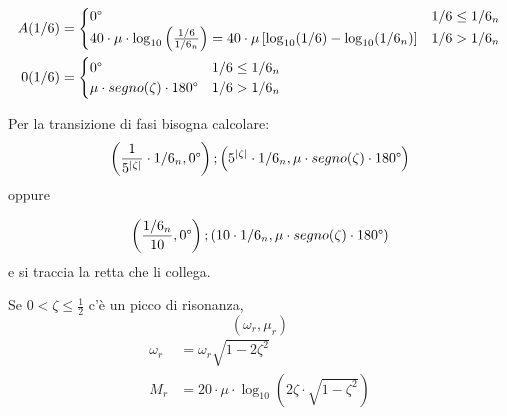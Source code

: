 \documentclass[a4paper]{article}
\begin{document}
\begin{definition}
  \[
    \begin{aligned}
      A(1/6) &= \begin{cases}
        0\degree & 1/6 \le 1/6_n\\
        40 \cdot \mu \cdot \log_{10} \left( \frac{1/6}{1/6_n} \right) = 40 \cdot \mu \left[
      \log_{10}(1/6) - \log_{10}(1/6_n) \right] & 1/6 > 1/6_n
    \end{cases}\\
        0(1/6) &= \begin{cases}
          0\degree & 1/6 \le 1/6_n\\
          \mu \cdot segno(\zeta) \cdot 180\degree & 1/6 > 1/6_n
        \end{cases}
        \end{aligned}
      \] 

      Per la transizione di fasi bisogna calcolare:
      \[
        \left( \frac{1}{5^{|\zeta|}} \cdot 1/6_n, 0\degree \right);
        \left( 5^{|\zeta|} \cdot 1/6_n, \mu \cdot segno(\zeta) \cdot 180\degree \right) 
      \] 
      oppure

      \[
        \left( \frac{1/6_n}{10}, 0\degree \right);
        \left(10 \cdot 1/6_n, \mu \cdot segno(\zeta) \cdot 180\degree \right) 
      \] 
      e si traccia la retta che li collega.

      \vspace{1em}
      \noindent
      Se \( 0 < \zeta \le \frac{1}{2} \) c'è un picco di risonanza,
      \[
        \left( \omega_r, \mu_r \right) 
      \] 
      \[
        \begin{aligned}
          \omega_r &= \omega_r \sqrt{1 - 2 \zeta^2}\\ 
          M_r &= 20 \cdot \mu \cdot \log_{10} \left( 2 \zeta \cdot \sqrt{1 - \zeta^2} \right)
        \end{aligned}
      \] 
\end{definition}
\end{document}
